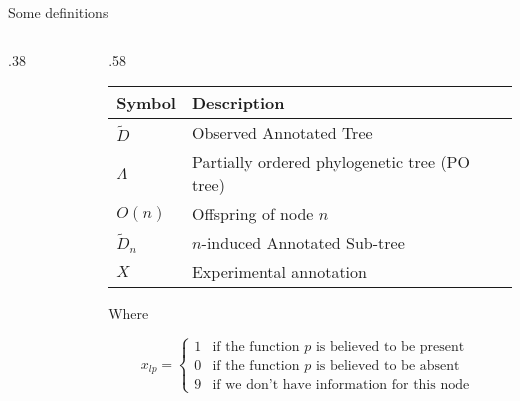 \documentclass[9pt,handout,ignorenonframetext,]{beamer}
\newcommand{\includetikz}[2]{
\begin{figure}
\scalebox{#2}{

}
\end{figure}
}
\newcommand{\phylo}{\Lambda{}} %
\newcommand{\aphylo}{D{}}      %
\newcommand{\aphyloObs}{\tilde \aphylo{}} %
\newcommand{\AnnObs}{X{}}
\newcommand{\annObs}{x{}}
\def\begincols{\begin{columns}[T]}
\def\begincol{\begin{column}[T]}
\def\endcol{\end{column}}
\def\endcols{\end{columns}}
\begin{document}
\begin{frame}[t,label=definitions]{Some definitions}

\begincols

\begincol{.38\linewidth}

\includetikz{simple_tree_names.tex}{.5}

\endcol

\begincol{.58\linewidth}

\footnotesize

\begin{longtable}[]{@{}ll@{}}
\toprule
Symbol & Description\tabularnewline
\midrule
\endhead
\(\aphyloObs\) & Observed Annotated Tree\tabularnewline
\(\phylo\) & Partially ordered phylogenetic tree (PO
tree)\tabularnewline
\(O(n)\) & Offspring of node \(n\)\tabularnewline
\(\aphyloObs_n\) & \(n\)-induced Annotated Sub-tree\tabularnewline
\(\AnnObs\) & Experimental annotation\tabularnewline
\bottomrule
\end{longtable}

Where

\[
\annObs_{lp} = \left\{
\begin{array}{ll}
1 & \mbox{if the function }p\mbox{ is believed to be present}\\
0 & \mbox{if the function }p\mbox{ is believed to be absent}\\
9 & \mbox{if we don't have information for this node }
\end{array}\right.
\]

\normalsize

\hyperlink{formaldef}{}

\endcol

\endcols

\end{frame}
\end{document}

